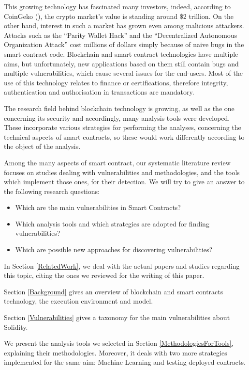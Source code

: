 \documentclass[a4paper,sigconf, language=french,
language=german, language=spanish, language=english]{acmart}
\begin{document}
This growing technology has fascinated many investors, indeed, according to CoinGeko (\cite{Coin}), 
the crypto market's value is standing around \$2 trillion. 
On the other hand, interest in such a market has grown even among malicious attackers. 
Attacks such as the “Parity Wallet Hack” and the “Decentralized Autonomous Organization Attack” cost millions of dollars simply because of 
naive bugs in the smart contract code. Blockchain and smart contract technologies have multiple aims, but unfortunately, new applications 
based on them still contain bugs and multiple vulnerabilities, which cause 
several issues for the end-users. Most of the use of this technology relates to finance or certifications, therefore integrity, 
authentication and authorisation in transactions are mandatory. 

The research field behind blockchain technology is growing, as well as the one concerning 
its security and accordingly, many analysis tools were developed. 
These incorporate various strategies for performing the analyses, concerning the technical aspects of smart contracts, 
so these would work differently according to the object of the analysis. 

Among the many aspects of smart contract, our systematic
literature review focuses on studies dealing with vulnerabilities and methodologies, and the tools which implement those ones, for their detection. We will try to give an answer to the following 
research questions:
\begin{itemize}
    \item Which are the main vulnerabilities in Smart Contracts?
    \item Which analysis tools and which strategies are adopted for finding vulnerabilities?
    \item Which are possible new approaches for discovering vulnerabilities?
\end{itemize}


In Section \ref{RelatedWork}, we deal with the actual papers and studies regarding this topic, citing the ones we reviewed for the writing of this paper.

Section \ref{Background} gives an overview of blockchain and smart contracts technology, the execution environment and model. 

Section \ref{Vulnerabilities} gives a taxonomy for the main vulnerabilities about Solidity. 

We present the analysis tools we selected in Section \ref{MethodologiesForTools}, explaining their methodologies. Moreover, it deals with two more strategies implemented for the same aim: Machine Learning and testing deployed contracts.
\end{document}
